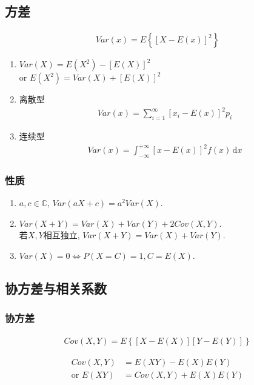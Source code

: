 \subsection{方差}
\begin{definition}
    \begin{align*}
        Var(x)=E\left\{\left[X-E(x)\right]^2\right\}
    \end{align*}
\end{definition}

\begin{enumerate}
    \item $Var(X)=E(X^2)-\left[E(X)\right]^2$ \\
    or $E(X^2)=Var(X)+[E(X)]^2$
    \item 离散型
    \begin{align*}
        Var(x)=\sum_{i=1}^{\infty}\left[x_i-E(x)\right]^2p_i
    \end{align*}
    \item 连续型
    \begin{align*}
        Var(x)=\int_{-\infty}^{+\infty}\left[x-E(x)\right]^2f(x)\,\mathrm{d}x
    \end{align*}
\end{enumerate}

\subsubsection{性质}
\begin{enumerate}
    \item $a,c\in \mathbb{C},\, Var(aX+c)=a^2Var(X)$.
    \item $Var(X+Y)=Var(X)+Var(Y)+2Cov(X,Y)$. \\
    若$X,Y$相互独立, $Var(X+Y)=Var(X)+Var(Y)$. 
    \item $Var(X)=0\Longleftrightarrow P(X=C)=1, C=E(X)$.
\end{enumerate}

\subsection{协方差与相关系数}
\subsubsection{协方差}
\begin{definition}
    \begin{align*}
        Cov(X,Y)=E\left\{ \left[X-E(X)\right]\left[Y-E(Y)\right] \right\}
    \end{align*}
\end{definition}
\begin{align*}
    Cov(X,Y)&=E(XY)-E(X)E(Y)\\
    \text{or } E(XY)&=Cov(X,Y)+E(X)E(Y)
\end{align*}

